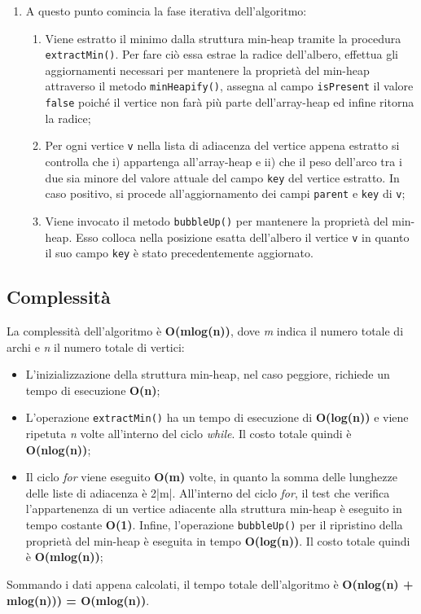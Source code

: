 \begin{itemize}
\begin{enumerate}
		\item A questo punto comincia la fase iterativa dell'algoritmo:
		\begin{enumerate}
			\item Viene estratto il minimo dalla struttura min-heap tramite la procedura \texttt{extractMin()}. Per fare ciò essa estrae la radice dell'albero, effettua gli aggiornamenti necessari per mantenere la proprietà del min-heap attraverso il metodo \texttt{minHeapify()}, assegna al campo \texttt{isPresent} il valore \texttt{false} poiché il vertice non farà più parte dell'array-heap ed infine ritorna la radice;
			\item Per ogni vertice \texttt{v} nella lista di adiacenza del vertice appena estratto si controlla che i) appartenga all'array-heap e ii) che il peso dell'arco tra i due sia minore del valore attuale del campo \texttt{key} del vertice estratto. In caso positivo, si procede all'aggiornamento dei campi \texttt{parent} e \texttt{key} di \texttt{v};
			\item Viene invocato il metodo \texttt{bubbleUp()} per mantenere la proprietà del min-heap. Esso colloca nella posizione esatta dell'albero il vertice \texttt{v} in quanto il suo campo \texttt{key} è stato precedentemente aggiornato.
		\end{enumerate} 
	\end{enumerate}
\end{itemize}

\subsection{Complessità}
La complessità dell'algoritmo è \textbf{O(mlog(n))}, dove \emph{m} indica il numero totale di archi e \emph{n} il numero totale di vertici:
\begin{itemize}
	\item L'inizializzazione della struttura min-heap, nel caso peggiore, 	richiede un tempo di esecuzione \textbf{O(n)};
	\item L'operazione \texttt{extractMin()} ha un tempo di esecuzione di \textbf{O(log(n))} e viene ripetuta \emph{n} volte all'interno del ciclo \emph{while}. Il costo totale quindi è \textbf{O(nlog(n))};
	\item Il ciclo \emph{for} viene eseguito \textbf{O(m)} volte, in quanto la somma delle lunghezze delle liste di adiacenza è 2|m|. All'interno del ciclo \emph{for}, il test che verifica l'appartenenza di un vertice adiacente alla struttura min-heap è eseguito in tempo costante \textbf{O(1)}. Infine, l'operazione \texttt{bubbleUp()} per il ripristino della proprietà del min-heap è eseguita in tempo \textbf{O(log(n))}. Il costo totale quindi è \textbf{O(mlog(n))};
\end{itemize}
Sommando i dati appena calcolati, il tempo totale dell'algoritmo è \textbf{O(nlog(n) + mlog(n))) = O(mlog(n))}.
\pagebreak